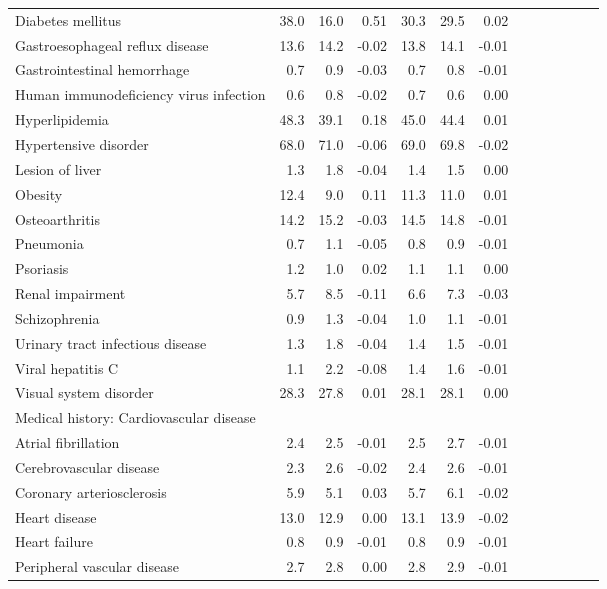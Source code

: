 \documentclass[11pt,]{article}
\begin{document}
\begin{longtable}{lrrrrrrrrrrrr}
      Diabetes mellitus & 38.0 & 16.0 &  0.51 & 30.3 & 29.5 &  0.02 \\ 
      Gastroesophageal reflux disease & 13.6 & 14.2 & -0.02 & 13.8 & 14.1 & -0.01 \\ 
      Gastrointestinal hemorrhage &  0.7 &  0.9 & -0.03 &  0.7 &  0.8 & -0.01 \\ 
      Human immunodeficiency virus infection &  0.6 &  0.8 & -0.02 &  0.7 &  0.6 &  0.00 \\ 
      Hyperlipidemia & 48.3 & 39.1 &  0.18 & 45.0 & 44.4 &  0.01 \\ 
      Hypertensive disorder & 68.0 & 71.0 & -0.06 & 69.0 & 69.8 & -0.02 \\ 
      Lesion of liver &  1.3 &  1.8 & -0.04 &  1.4 &  1.5 &  0.00 \\ 
      Obesity & 12.4 &  9.0 &  0.11 & 11.3 & 11.0 &  0.01 \\ 
      Osteoarthritis & 14.2 & 15.2 & -0.03 & 14.5 & 14.8 & -0.01 \\ 
      Pneumonia &  0.7 &  1.1 & -0.05 &  0.8 &  0.9 & -0.01 \\ 
      Psoriasis &  1.2 &  1.0 &  0.02 &  1.1 &  1.1 &  0.00 \\ 
      Renal impairment &  5.7 &  8.5 & -0.11 &  6.6 &  7.3 & -0.03 \\ 
      Schizophrenia &  0.9 &  1.3 & -0.04 &  1.0 &  1.1 & -0.01 \\ 
      Urinary tract infectious disease &  1.3 &  1.8 & -0.04 &  1.4 &  1.5 & -0.01 \\ 
      Viral hepatitis C &  1.1 &  2.2 & -0.08 &  1.4 &  1.6 & -0.01 \\ 
      Visual system disorder & 28.3 & 27.8 &  0.01 & 28.1 & 28.1 &  0.00 \\ 
  Medical history: Cardiovascular disease &    &    &     &    &    &     \\ 
      Atrial fibrillation &  2.4 &  2.5 & -0.01 &  2.5 &  2.7 & -0.01 \\ 
      Cerebrovascular disease &  2.3 &  2.6 & -0.02 &  2.4 &  2.6 & -0.01 \\ 
      Coronary arteriosclerosis &  5.9 &  5.1 &  0.03 &  5.7 &  6.1 & -0.02 \\ 
      Heart disease & 13.0 & 12.9 &  0.00 & 13.1 & 13.9 & -0.02 \\ 
      Heart failure &  0.8 &  0.9 & -0.01 &  0.8 &  0.9 & -0.01 \\ 
      Peripheral vascular disease &  2.7 &  2.8 &  0.00 &  2.8 &  2.9 & -0.01 \\ 

\end{longtable}
\end{document}
